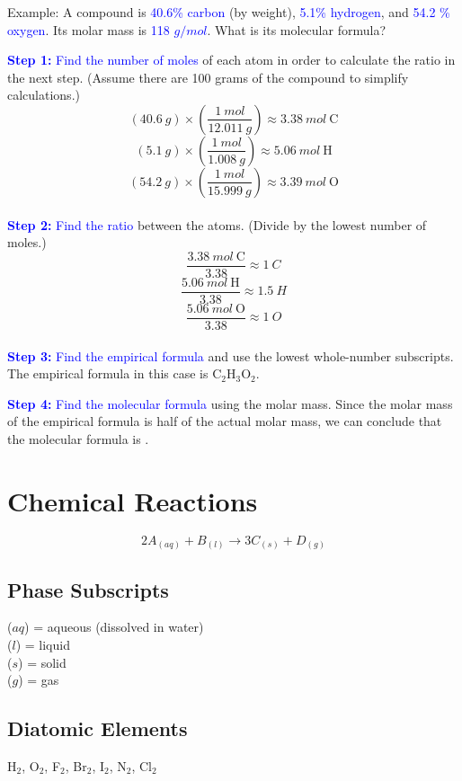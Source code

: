 \documentclass[a4paper, 12pt]{article}
\begin{document}
\noindent Example: A compound is \textcolor{blue}{40.6\% carbon} (by weight), \textcolor{blue}{5.1\% hydrogen}, and \textcolor{blue}{54.2 \% oxygen}. Its molar mass is \textcolor{blue}{118 $g/mol$}. What is its molecular formula?

\textcolor{blue}{\textbf{Step 1:} Find the number of moles} of each atom in order to calculate the ratio in the next step. (Assume there are 100 grams of the compound to simplify calculations.)
$$(40.6 \: g) \times \left(\frac{1 \: mol}{12.011 \: g}\right) \approx 3.38 \: mol \: \text{C}$$
$$(5.1 \: g) \times \left(\frac{1 \: mol}{1.008 \: g}\right) \approx 5.06 \: mol \: \text{H}$$
$$(54.2 \: g) \times \left(\frac{1 \: mol}{15.999 \: g}\right) \approx 3.39 \: mol \: \text{O}$$
\\
\textcolor{blue}{\textbf{Step 2:} Find the ratio} between the atoms. (Divide by the lowest number of moles.)
$$\frac{3.38 \: mol \: \text{C}}{3.38} \approx 1 \: C$$
$$\frac{5.06 \: mol \: \text{H}}{3.38} \approx 1.5 \: H$$
$$\frac{5.06 \: mol \: \text{O}}{3.38} \approx 1 \: O$$
\\
\textcolor{blue}{\textbf{Step 3:} Find the empirical formula} and use the lowest whole-number subscripts. The empirical formula in this case is C$_2$H$_3$O$_2$.

\textcolor{blue}{\textbf{Step 4:} Find the molecular formula} using the molar mass. Since the molar mass of the empirical formula is half of the actual molar mass, we can conclude that the molecular formula is .

\section{Chemical Reactions}

$$2A_{(aq)} + B_{(l)} \longrightarrow 3C_{(s)} + D_{(g)}$$

\subsection{Phase Subscripts}

($aq$) = aqueous (dissolved in water) \\ ($l$) = liquid
\\ ($s$) = solid \\ ($g$) = gas

\subsection{Diatomic Elements}
H$_2$, O$_2$, F$_2$, Br$_2$, I$_2$, N$_2$, Cl$_2$
\end{document}
